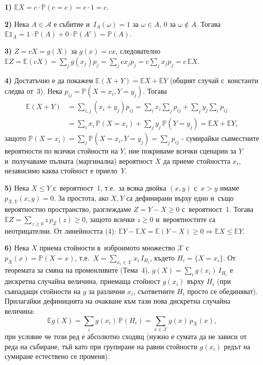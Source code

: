 \begin{proofbox}
\textbf{1)} $\mathbb EX = c\cdot\mathbb P(c=c)=c\cdot1=c$.

\textbf{2)} Нека $A\in\mathcal A$ е събитие и~$I_A(\omega)=1$
за $\omega\in A$, $0$ за $\omega\notin A$. Тогава $\mathbb E\mathbb
1_A = 1\cdot\mathbb P(A) + 0\cdot\mathbb P(A^c) = \mathbb P(A)$.

\textbf{3)} $Z=cX=g(X)$ за $g(x)=cx$, следователно $\mathbb EZ =
\mathbb E(cX) = \sum_j g(x_j)p_j = \sum_j cx_j p_j = c\sum_j x_j p_j =
c\,\mathbb EX$.

\textbf{4)} Достатъчно е да покажем $\mathbb E(X+Y)=\mathbb EX+
\mathbb EY$ (общият случай с~константи следва от~3). Нека $p_{ij}=
\mathbb P(X=x_i,Y=y_j)$. Тогава
\begin{align*}
  \mathbb E(X+Y) &= \sum_{i,j}(x_i+y_j)p_{ij} = \sum_i x_i\sum_j p_{ij} + \sum_j y_j\sum_i p_{ij}\\
  &= \sum_i x_i\,\mathbb P(X=x_i) + \sum_j y_j\,\mathbb P(Y=y_j) = \mathbb EX+\mathbb EY,
\end{align*}
защото $\mathbb P(X=x_i)=\sum_j\mathbb P(X=x_i,Y=y_j)=\sum_j p_{ij}$
- сумирайки съвместните вероятности по всички стойности на $Y$, ние
покриваме всички сценарии за $Y$ и~получаваме пълната (маргинална)
вероятност $X$ да приеме стойността $x_i$, независимо каква стойност
е приело~$Y$.

\textbf{5)} Нека $X\le Y$ с~вероятност~1, т.е.\ за всяка двойка
$(x,y)$ с~$x>y$ имаме $p_{X,Y}(x,y)=0$. За простота, ако $X,Y$ са
дефинирани върху едно и~също вероятностно пространство, разглеждаме
$Z=Y-X\ge0$ с~вероятност~1. Тогава $\mathbb EZ = \sum_{z\ge0} z\,
p_Z(z)\ge 0$, защото всички $z\ge0$ и~вероятностите са неотрицателни.
От линейността (4): $\mathbb EY-\mathbb EX=\mathbb E(Y-X)\ge 0
\Rightarrow \mathbb EX\le\mathbb EY$.

\textbf{6)} Нека $X$ приема стойности в~изброимото множество
$\mathcal X$ с~$p_X(x)=\mathbb P(X=x)$, т.е.\ $X=\sum_{x_i\in
\mathcal X} x_i\,I_{H_i}$, където $H_i=\{X=x_i\}$. От
теоремата за смяна на променливите (Тема~4), $g(X) = \sum_i
g(x_i)\,I_{H_i}$ е дискретна случайна величина, приемаща
стойност $g(x_i)$ върху $H_i$ (при съвпадащи стойности на $g$ за
различни $x_i$, съответните $H_i$ просто се обединяват). Прилагайки
дефиницията на очакване към тази нова дискретна случайна величина:
\[
  \mathbb Eg(X) = \sum_i g(x_i)\,\mathbb P(H_i) = \sum_{x\in\mathcal X} g(x)\,p_X(x),
\]
при условие че този ред е абсолютно сходящ (нужно е сумата да не
зависи от реда на събиране, тъй като при групиране на равни стойности
$g(x_i)$ редът на сумиране естествено се променя). \qedbg


\end{proofbox}
